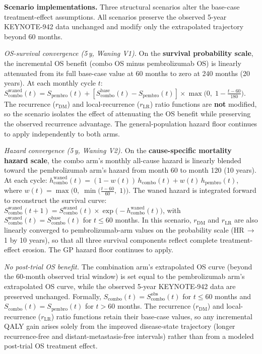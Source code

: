 \documentclass[11pt,a4paper]{article}
\begin{document}
\noindent\textbf{Scenario implementations.} Three structural scenarios alter the base-case treatment-effect assumptions. All scenarios preserve the observed 5-year KEYNOTE-942 data unchanged and modify only the extrapolated trajectory beyond 60 months.

\textit{OS-survival convergence (5\,y, Waning V1).} On the \textbf{survival probability scale}, the incremental OS benefit (combo OS minus pembrolizumab OS) is linearly attenuated from its full base-case value at 60 months to zero at 240 months (20 years). At each monthly cycle $t$: $S_{\text{combo}}^{\text{waned}}(t) = S_{\text{pembro}}(t) + [S_{\text{combo}}^{\text{base}}(t) - S_{\text{pembro}}(t)] \times \max\bigl(0,\; 1 - \frac{t - 60}{180}\bigr)$. The recurrence ($r_{\text{DM}}$) and local-recurrence ($r_{\text{LR}}$) ratio functions are \textbf{not} modified, so the scenario isolates the effect of attenuating the OS benefit while preserving the observed recurrence advantage. The general-population hazard floor continues to apply independently to both arms.

\textit{Hazard convergence (5\,y, Waning V2).} On the \textbf{cause-specific mortality hazard scale}, the combo arm's monthly all-cause hazard is linearly blended toward the pembrolizumab arm's hazard from month 60 to month 120 (10 years). At each cycle: $h_{\text{combo}}^{\text{waned}}(t) = (1 - w(t))\,h_{\text{combo}}(t) + w(t)\,h_{\text{pembro}}(t)$, where $w(t) = \max\bigl(0,\; \min\bigl(\frac{t - 60}{60},\; 1\bigr)\bigr)$. The waned hazard is integrated forward to reconstruct the survival curve: $S_{\text{combo}}^{\text{waned}}(t+1) = S_{\text{combo}}^{\text{waned}}(t) \times \exp\bigl(-h_{\text{combo}}^{\text{waned}}(t)\bigr)$, with $S_{\text{combo}}^{\text{waned}}(t) = S_{\text{combo}}^{\text{base}}(t)$ for $t \leq 60$ months. In this scenario, $r_{\text{DM}}$ and $r_{\text{LR}}$ are also linearly converged to pembrolizumab-arm values on the probability scale (HR\,$\to$\,1 by 10 years), so that all three survival components reflect complete treatment-effect erosion. The GP hazard floor continues to apply.

\textit{No post-trial OS benefit.} The combination arm's extrapolated OS curve (beyond the 60-month observed trial window) is set equal to the pembrolizumab arm's extrapolated OS curve, while the observed 5-year KEYNOTE-942 data are preserved unchanged. Formally, $S_{\text{combo}}(t) = S_{\text{combo}}^{\text{obs}}(t)$ for $t \leq 60$ months and $S_{\text{combo}}(t) = S_{\text{pembro}}(t)$ for $t > 60$ months. The recurrence ($r_{\text{DM}}$) and local-recurrence ($r_{\text{LR}}$) ratio functions retain their base-case values, so any incremental QALY gain arises solely from the improved disease-state trajectory (longer recurrence-free and distant-metastasis-free intervals) rather than from a modeled post-trial OS treatment effect.
\end{document}
